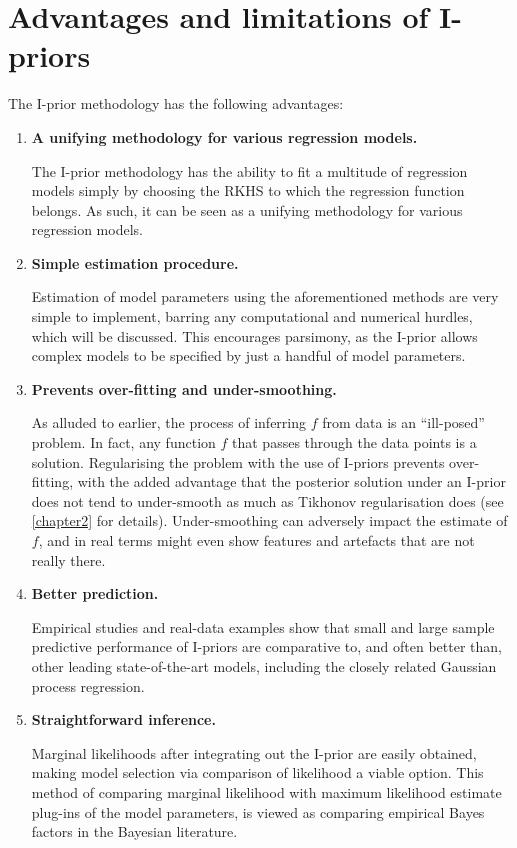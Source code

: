 \documentclass[a4paper,showframe,11pt]{report}
\begin{document}
\section{Advantages and limitations of I-priors}

The I-prior methodology has the following advantages:

\begin{enumerate}
  \item \textbf{A unifying methodology for various regression models.}
  
  The I-prior methodology has the ability to fit a multitude of regression models simply by choosing the RKHS to which the regression function belongs.
  As such, it can be seen as a unifying methodology for various regression models. 
  
  \item \textbf{Simple estimation procedure.}
  
  Estimation of model parameters using the aforementioned methods are very simple to implement, barring any computational and numerical hurdles, which will be discussed.
  This encourages parsimony, as the I-prior allows complex models to be specified by just a handful of model parameters.
  
  \item \textbf{Prevents over-fitting and under-smoothing.}
  
  As alluded to earlier, the process of inferring $f$ from data is an ``ill-posed'' problem.
  In fact, any function $f$ that passes through the data points is a solution.
  Regularising the problem with the use of I-priors prevents over-fitting, with the added advantage that the posterior solution under an I-prior does not tend to under-smooth as much as Tikhonov regularisation does (see \cref{chapter2} for details).
  Under-smoothing can adversely impact the estimate of $f$, and in real terms might even show features and artefacts that are not really there.
  
  \item \textbf{Better prediction.}
  
  Empirical studies and real-data examples show that small and large sample predictive performance of I-priors are comparative to, and often better than, other leading state-of-the-art models, including the closely related Gaussian process regression.

  \item \textbf{Straightforward inference.}
  
  Marginal likelihoods after integrating out the I-prior are easily obtained, making model selection via comparison of likelihood a viable option.
  This method of comparing marginal likelihood with maximum likelihood estimate plug-ins of the model parameters, is viewed as comparing empirical Bayes factors in the Bayesian literature.
  
%  
  
\end{enumerate}
\end{document}
